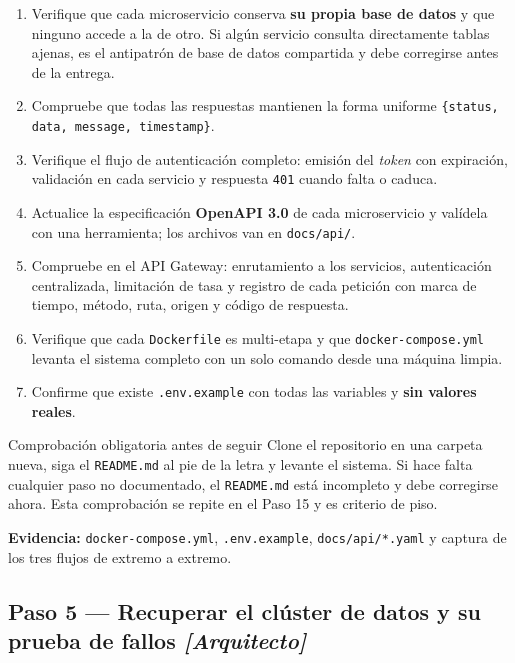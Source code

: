 \documentclass[11pt,a4paper]{article}
\newcommand{\paso}[1]{\subsection{#1}}
\begin{document}
	\begin{enumerate}[leftmargin=*,itemsep=4pt]
		\item Verifique que cada microservicio conserva \textbf{su propia base de datos} y que ninguno accede a la de otro. Si algún servicio consulta directamente tablas ajenas, es el antipatrón de base de datos compartida y debe corregirse antes de la entrega.
		\item Compruebe que todas las respuestas mantienen la forma uniforme \texttt{\{status, data, message, timestamp\}}.
		\item Verifique el flujo de autenticación completo: emisión del \emph{token} con expiración, validación en cada servicio y respuesta \texttt{401} cuando falta o caduca.
		\item Actualice la especificación \textbf{OpenAPI 3.0} de cada microservicio y valídela con una herramienta; los archivos van en \texttt{docs/api/}.
		\item Compruebe en el API Gateway: enrutamiento a los servicios, autenticación centralizada, limitación de tasa y registro de cada petición con marca de tiempo, método, ruta, origen y código de respuesta.
		\item Verifique que cada \texttt{Dockerfile} es multi-etapa y que \texttt{docker-compose.yml} levanta el sistema completo con un solo comando desde una máquina limpia.
		\item Confirme que existe \texttt{.env.example} con todas las variables y \textbf{sin valores reales}.
	\end{enumerate}
	
	\begin{pisoBox}{Comprobación obligatoria antes de seguir}
		Clone el repositorio en una carpeta nueva, siga el \texttt{README.md} al pie de la letra y levante el sistema. Si hace falta cualquier paso no documentado, el \texttt{README.md} está incompleto y debe corregirse ahora. Esta comprobación se repite en el Paso 15 y es criterio de piso.
	\end{pisoBox}
	
	\textbf{Evidencia:} \texttt{docker-compose.yml}, \texttt{.env.example}, \texttt{docs/api/*.yaml} y captura de los tres flujos de extremo a extremo.
	
	\paso{Paso 5 --- Recuperar el clúster de datos y su prueba de fallos \emph{[Arquitecto]}}
	
\end{document}
